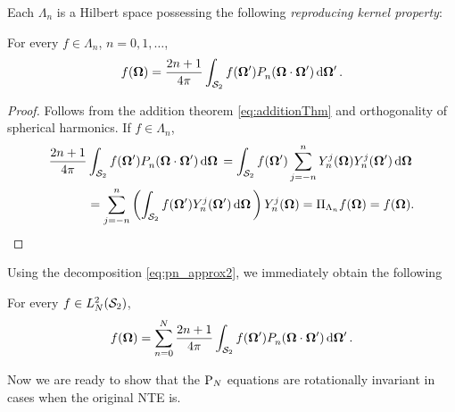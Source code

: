 Each $\Lambda_n$ is a Hilbert space possessing the following \textit{reproducing kernel property}:
\begin{lemma}
	For every $f \in \Lambda_n$, $n = 0,1,\ldots$, 
	$$
		f(\bomega) = \frac{2n+1}{4\pi} \intA[']{f(\bomega')\P{n}{}(\bomega\cdot\bomega')}.
	$$
\end{lemma}
\begin{proof}
	Follows from the addition theorem \eqref{eq:additionThm} and orthogonality of spherical harmonics. If $f \in
	\Lambda_n$,
	$$
		\begin{aligned}
			\frac{2n+1}{4\pi}&\intA{f(\bomega')\P{n}{}(\bomega\cdot\bomega')} = 
			\intA{f(\bomega')\sum_{j=-n}^{n}\Y{n}{j}(\bomega)\Y{n}{j}(\bomega')} \\
			&= \sum_{j=-n}^{n}\left(\intA{f(\bomega')\Y{n}{j}(\bomega')}\right)\Y{n}{j}(\bomega) =
			\Projop[\Lambda_n]f(\bomega) = f(\bomega).
		\end{aligned}
	$$
\end{proof}
\noindent Using the decomposition \eqref{eq:pn_approx2}, we immediately obtain the following
\begin{corollary}\label{cor:repker}
	For every $f\in\Lp[2]_N(\Sphere)$,
	\begin{equation}\label{eq:repker}
		f(\bomega) = \sum_{n=0}^{N} \frac{2n+1}{4\pi} \intA[']{f(\bomega')\P{n}{}(\bomega\cdot\bomega')}.
	\end{equation} 
\end{corollary}
%
\noindent Now we are ready to show that the $\PN$ equations are rotationally
invariant in cases when the original NTE is.

